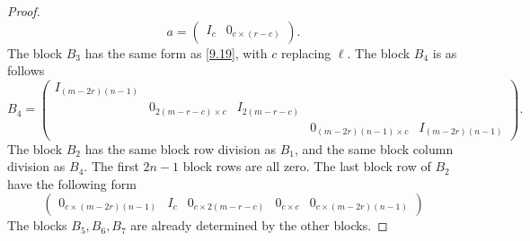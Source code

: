 \documentclass[12pts]{amsart}
\begin{document}
\begin{proof}
\begin{equation}
a=\begin{pmatrix}I_c&0_{c\times (r-c)}\end{pmatrix}.
\end{equation}
The block $B_3$ has the same form as \eqref{9.19}, with $c$ replacing $\ell$. The block $B_4$ is as follows
\begin{equation}\label{10.3}
B_4=\begin{pmatrix}I_{(m-2r)(n-1)}\\&0_{2(m-r-c)\times c}&I_{2(m-r-c)}\\&&&0_{(m-2r)(n-1)\times c}&I_{(m-2r)(n-1)} \end{pmatrix}.
\end{equation}
The block $B_2$ has the same block row division as $B_1$, and the same block column division as $B_4$. The first $2n-1$ block rows are all zero. The last block row of $B_2$ have the following form
\begin{equation}\label{10.4}
\begin{pmatrix}0_{c\times (m-2r)(n-1)}& I_c&0_{c\times 2(m-r-c)}&0_{c\times c}&0_{c\times (m-2r)(n-1)}\end{pmatrix}
\end{equation}
The blocks $B_5, B_6, B_7$ are already determined by the other blocks.


\end{proof}
\end{document}
